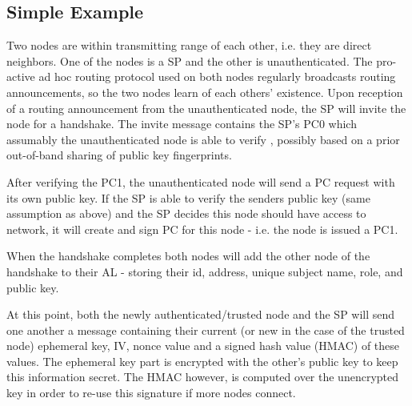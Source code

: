 \subsection{Simple Example}
Two nodes are within transmitting range of each other, i.e. they are direct
neighbors. One of the nodes is a \ac{SP} and the other is unauthenticated. The
pro-active ad hoc routing protocol used on both nodes regularly broadcasts
routing announcements, so the two nodes learn of each others' existence. Upon
reception of a routing announcement from the unauthenticated node, the \ac{SP}
will invite the node for a handshake. The invite message contains the \ac{SP}'s
\ac{PC0} which assumably the unauthenticated node is able to verify , possibly
based on a prior out-of-band sharing of public key fingerprints.

After verifying the \ac{PC1}, the unauthenticated node will send a \ac{PC}
request with its own public key. If the \ac{SP} is able to verify the senders
public key (same assumption as above) and the \ac{SP} decides this node should
have access to network, it will create and sign \ac{PC} for this node - i.e. the
node is issued a \ac{PC1}.



When the handshake completes both nodes will add the other node of the handshake
to their \ac{AL} - storing their id, address, unique subject name, role, and
public key.

At this point, both the newly authenticated/trusted node and the \ac{SP} will
send one another a message containing their current (or new in the case of the
trusted node) ephemeral key, IV, nonce value and a signed hash value (HMAC) of
these values. The ephemeral key part is encrypted with the other's public key to
keep this information secret. The HMAC however, is computed over the unencrypted
key in order to re-use this signature if more nodes connect.

